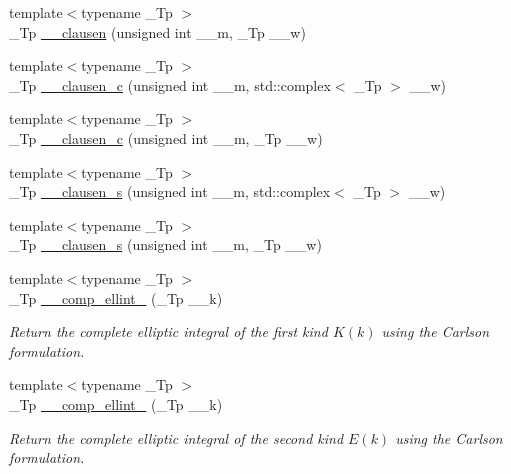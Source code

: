 \begin{DoxyCompactItemize}
{\footnotesize template$<$typename \+\_\+\+Tp $>$ }\\\+\_\+\+Tp \hyperlink{namespacestd_1_1____detail_a12dab8bfc7bc5554fe0db5d1777d9887}{\+\_\+\+\_\+clausen} (unsigned int \+\_\+\+\_\+m, \+\_\+\+Tp \+\_\+\+\_\+w)
\item 
{\footnotesize template$<$typename \+\_\+\+Tp $>$ }\\\+\_\+\+Tp \hyperlink{namespacestd_1_1____detail_a06b95eeefe47e8899e2e0a6bbd3ad31b}{\+\_\+\+\_\+clausen\+\_\+c} (unsigned int \+\_\+\+\_\+m, std\+::complex$<$ \+\_\+\+Tp $>$ \+\_\+\+\_\+w)
\item 
{\footnotesize template$<$typename \+\_\+\+Tp $>$ }\\\+\_\+\+Tp \hyperlink{namespacestd_1_1____detail_a44f2a2f49402b847c8408da5b18f8107}{\+\_\+\+\_\+clausen\+\_\+c} (unsigned int \+\_\+\+\_\+m, \+\_\+\+Tp \+\_\+\+\_\+w)
\item 
{\footnotesize template$<$typename \+\_\+\+Tp $>$ }\\\+\_\+\+Tp \hyperlink{namespacestd_1_1____detail_a19bb52bc473e5c3811281acbbdefa869}{\+\_\+\+\_\+clausen\+\_\+s} (unsigned int \+\_\+\+\_\+m, std\+::complex$<$ \+\_\+\+Tp $>$ \+\_\+\+\_\+w)
\item 
{\footnotesize template$<$typename \+\_\+\+Tp $>$ }\\\+\_\+\+Tp \hyperlink{namespacestd_1_1____detail_a1b8a79cb99cbbe5ebbbc16a1dfa7d2c1}{\+\_\+\+\_\+clausen\+\_\+s} (unsigned int \+\_\+\+\_\+m, \+\_\+\+Tp \+\_\+\+\_\+w)
\item 
{\footnotesize template$<$typename \+\_\+\+Tp $>$ }\\\+\_\+\+Tp \hyperlink{namespacestd_1_1____detail_a7b23bcf7e9f20b1e353a047126e13af1}{\+\_\+\+\_\+comp\+\_\+ellint\+\_} (\+\_\+\+Tp \+\_\+\+\_\+k)
\begin{DoxyCompactList}\small\item\em Return the complete elliptic integral of the first kind $ K(k) $ using the Carlson formulation. \end{DoxyCompactList}\item 
{\footnotesize template$<$typename \+\_\+\+Tp $>$ }\\\+\_\+\+Tp \hyperlink{namespacestd_1_1____detail_a4836f4db24abd037705100750f82d375}{\+\_\+\+\_\+comp\+\_\+ellint\+\_} (\+\_\+\+Tp \+\_\+\+\_\+k)
\begin{DoxyCompactList}\small\item\em Return the complete elliptic integral of the second kind $ E(k) $ using the Carlson formulation. \end{DoxyCompactList}\item 

\end{DoxyCompactItemize}
